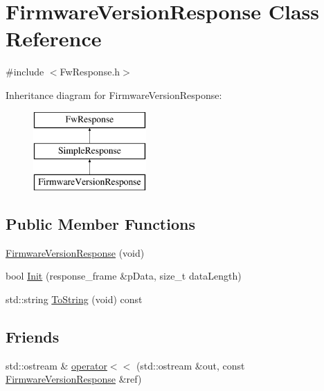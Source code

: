 \hypertarget{class_firmware_version_response}{\section{Firmware\-Version\-Response Class Reference}
\label{class_firmware_version_response}
}


{\ttfamily \#include $<$Fw\-Response.\-h$>$}

Inheritance diagram for Firmware\-Version\-Response\-:\begin{figure}[H]
\begin{center}
\leavevmode
\includegraphics[height=3.000000cm]{class_firmware_version_response}
\end{center}
\end{figure}
\subsection*{Public Member Functions}
\begin{DoxyCompactItemize}
\item 
\hyperlink{class_firmware_version_response_a9fef0cd9282882deb02ea9edca9f8733}{Firmware\-Version\-Response} (void)
\item 
bool \hyperlink{class_firmware_version_response_a5fc221081be8f4f5d7492719e00e0801}{Init} (response\-\_\-frame \&p\-Data, size\-\_\-t data\-Length)
\item 
std\-::string \hyperlink{class_firmware_version_response_aab01a171cd3137d472ec63a5a7593250}{To\-String} (void) const 
\end{DoxyCompactItemize}
\subsection*{Friends}
\begin{DoxyCompactItemize}
\item 
std\-::ostream \& \hyperlink{class_firmware_version_response_a37b570544d9c72195251b87e598a0451}{operator$<$$<$} (std\-::ostream \&out, const \hyperlink{class_firmware_version_response}{Firmware\-Version\-Response} \&ref)
\end{DoxyCompactItemize}
